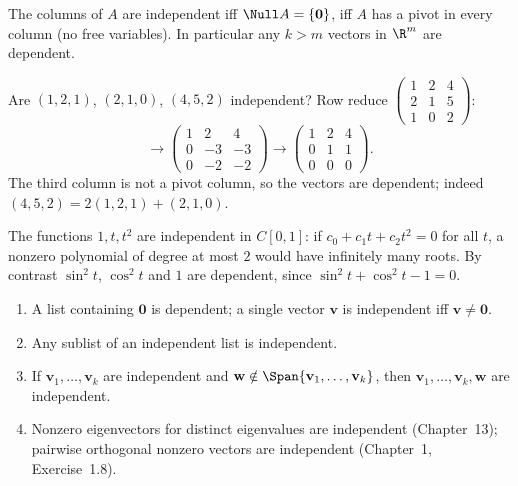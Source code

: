 \begin{theorem}\label{thm:indtest}
The columns of $A$ are independent iff $\Null A=\{\mathbf{0}\}$, iff $A$ has a pivot in every column (no free variables). In particular any $k>m$ vectors in $\R^m$ are dependent.
\end{theorem}

\begin{example}
Are $(1,2,1)$, $(2,1,0)$, $(4,5,2)$ independent? Row reduce $\begin{pmatrix}1&2&4\\2&1&5\\1&0&2\end{pmatrix}$:
\[ \to\begin{pmatrix}1&2&4\\0&-3&-3\\0&-2&-2\end{pmatrix}\to\begin{pmatrix}1&2&4\\0&1&1\\0&0&0\end{pmatrix}. \]
The third column is not a pivot column, so the vectors are dependent; indeed $(4,5,2)=2(1,2,1)+(2,1,0)$.
\end{example}

\begin{example}
The functions $1,t,t^2$ are independent in $C[0,1]$: if $c_0+c_1t+c_2t^2=0$ for all $t$, a nonzero polynomial of degree at most $2$ would have infinitely many roots. By contrast $\sin^2t$, $\cos^2t$ and $1$ are dependent, since $\sin^2t+\cos^2t-1=0$.
\end{example}

\begin{theorem}\label{thm:indprops}
\begin{enumerate}[label=(\roman*)]
  \item A list containing $\mathbf{0}$ is dependent; a single vector $\mathbf{v}$ is independent iff $\mathbf{v}\neq\mathbf{0}$.
  \item Any sublist of an independent list is independent.
  \item If $\mathbf{v}_1,\dots,\mathbf{v}_k$ are independent and $\mathbf{w}\notin\Span\{\mathbf{v}_1,\dots,\mathbf{v}_k\}$, then $\mathbf{v}_1,\dots,\mathbf{v}_k,\mathbf{w}$ are independent.
  \item Nonzero eigenvectors for distinct eigenvalues are independent (Chapter~13); pairwise orthogonal nonzero vectors are independent (Chapter~1, Exercise~1.8).
\end{enumerate}
\end{theorem}

